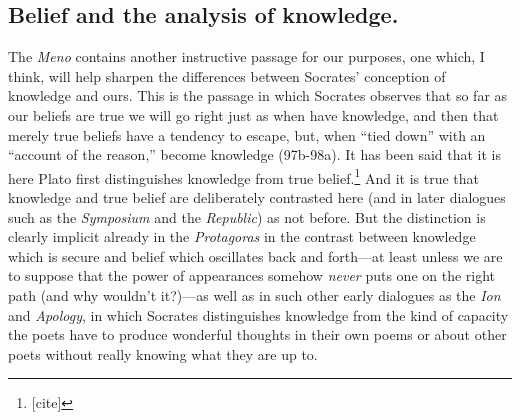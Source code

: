 \documentclass[11pt]{amsart}
\begin{document}
\subsection{Belief and the analysis of knowledge.} The \emph{Meno} contains another instructive passage for our purposes, one which, I think, will help sharpen the differences between Socrates' conception of knowledge and ours. This is the passage in which Socrates observes that so far as our beliefs are true we will go right just as when have knowledge, and then that merely true beliefs have a tendency to escape, but, when ``tied down'' with an ``account of the reason,'' become knowledge (97b-98a). It has been said that it is here Plato first distinguishes knowledge from true belief.\footnote{[cite]} And it is true that knowledge and true belief are deliberately contrasted here (and in later dialogues such as the \emph{Symposium} and the \emph{Republic}) as not before. But the distinction is clearly implicit already in the \emph{Protagoras} in the contrast between knowledge which is secure and belief which oscillates back and forth---at least unless we are to suppose that the power of appearances somehow \emph{never} puts one on the right path (and why wouldn't it?)---as well as in such other early dialogues as the \emph{Ion} and \emph{Apology}, in which Socrates distinguishes knowledge from the kind of capacity the poets have to produce wonderful thoughts in their own poems or about other poets without really knowing what they are up to.
\end{document}
